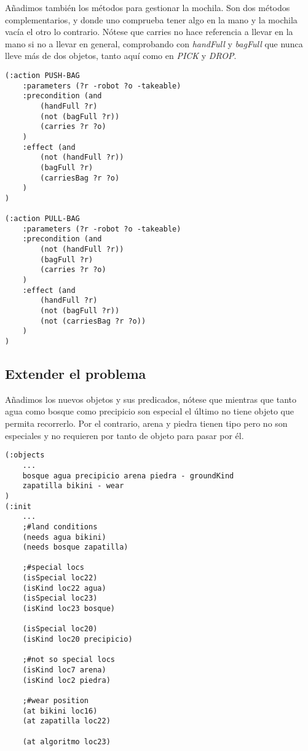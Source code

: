 \documentclass{article}
\begin{document}
Añadimos también los métodos para gestionar la mochila. Son dos métodos complementarios, y donde uno comprueba tener algo en la mano y la mochila vacía el otro lo contrario. Nótese que carries no hace referencia a llevar en la mano si no a llevar en general, comprobando con \emph{handFull} y \emph{bagFull} que nunca lleve más de dos objetos, tanto aquí como en \emph{PICK} y \emph{DROP}.

\begin{lstlisting}
(:action PUSH-BAG
    :parameters (?r -robot ?o -takeable)
    :precondition (and 
        (handFull ?r)
        (not (bagFull ?r))
        (carries ?r ?o)
    )
    :effect (and 
        (not (handFull ?r))
        (bagFull ?r)
        (carriesBag ?r ?o)
    )
)

(:action PULL-BAG
    :parameters (?r -robot ?o -takeable)
    :precondition (and 
        (not (handFull ?r))
        (bagFull ?r)
        (carries ?r ?o)
    )
    :effect (and 
        (handFull ?r)
        (not (bagFull ?r))
        (not (carriesBag ?r ?o))
    )
)
\end{lstlisting}

\subsection{Extender el problema}

Añadimos los nuevos objetos y sus predicados, nótese que mientras que tanto agua como bosque como precipicio son especial el último no tiene objeto que permita recorrerlo. Por el contrario, arena y piedra tienen tipo pero no son especiales y no requieren por tanto de objeto para pasar por él.

\begin{lstlisting}
(:objects 
	...
	bosque agua precipicio arena piedra - groundKind
    zapatilla bikini - wear
)
(:init
	...
	;#land conditions
    (needs agua bikini)
    (needs bosque zapatilla)
    
	;#special locs
    (isSpecial loc22)
    (isKind loc22 agua)
    (isSpecial loc23)
    (isKind loc23 bosque)

    (isSpecial loc20)
    (isKind loc20 precipicio)

    ;#not so special locs
    (isKind loc7 arena)
    (isKind loc2 piedra)
    
    ;#wear position
    (at bikini loc16)
    (at zapatilla loc22)
    
    (at algoritmo loc23)
\end{lstlisting}
\end{document}
